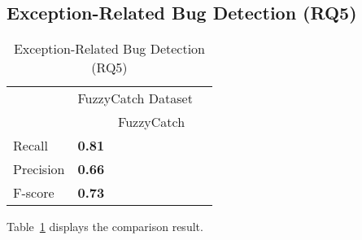 \subsection{Exception-Related Bug Detection (RQ5)}
\label{sec:rq1}

\begin{table}[t]%
  \caption {Exception-Related Bug Detection (RQ5)}
  \vspace{-12pt}
  \small
	\begin{center}
		\renewcommand{\arraystretch}{1}
		\begin{tabular}{|p{1.5cm}<{\centering}|p{1.25cm}<{\centering}|p{1.25cm}<{\centering}|p{1.5cm}<{\centering}}
		  \hline
			\multirow{2}{*}{} & \multicolumn{2}{c|}{FuzzyCatch Dataset} \\
			\cline{2-3}
			  & \tool  & FuzzyCatch~\cite{xrank-fse20} \\
			\hline
			Recall    & \textbf{0.81} & \\
			Precision & \textbf{0.66} & \\
			F-score   & \textbf{0.73} & \\
			\hline
		\end{tabular}
		\label{tab:xblock}
	\end{center}
\end{table}


Table~\ref{tab:xblock} displays the comparison result. 
